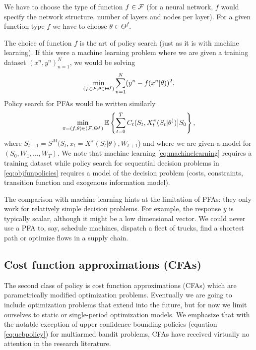 \documentclass[11pt,oneside,fleqn,reqno,titlepage]{article}
\newcommand{\E}{\mathbb{E}}
\newcommand{\bn}{\begin{eqnarray}}
\newcommand{\en}{\end{eqnarray}}
\newcounter{example}
\def \Fcal{{\cal F}}
\begin{document}
We have to choose the type of function $f\in\Fcal$ (for a neural network, $f$ would specify the network structure, number of layers and nodes per layer). For a given function type $f$ we have to choose $\theta\in\Theta^f$.

The choice of function $f$ is the art of policy search (just as it is with machine learning).  If this were a machine learning problem where we are given a training dataset $(x^n,y^n)_{n=1}^N$, we would be solving
\bn
\min_{(f\in\Fcal, \theta\in\Theta^f)}\sum_{n=1}^N(y^n - f(x^n|\theta))^2.\label{eq:machinelearning}
\en
Policy search for PFAs would be written similarly
\bn
\min_{\pi =(f,\theta) \in (\Fcal,\Theta^f)} \E\left\{\sum_{t=0}^T C_t(S_t,X^\pi_t(S_t|\theta^)) \big| S_0\right\}, \label{eq:objfunpolicies}
\en
where $S_{t+1}=S^M(S_t,x_t=X^\pi(S_t|\theta),W_{t+1}$) and where we are given a model for \linebreak $(S_0,W_1, \ldots, W_T)$.  We note that machine learning \eqref{eq:machinelearning} requires a training dataset while policy search for sequential decision problems in \eqref{eq:objfunpolicies} requires a model of the decision problem (costs, constraints, transition function and exogenous information model).

The comparison with machine learning hints at the limitation of PFAs: they only work for relatively simple decision problems.  For example, the response $y$ is typically scalar, although it might be a low dimensional vector.  We could never use a PFA to, say, schedule machines, dispatch a fleet of trucks, find a shortest path or optimize flows in a supply chain.





\subsection{Cost function approximations (CFAs)}
\label{sec:cfas}

The second class of policy is cost function approximations (CFAs) which are parametrically modified optimization problems.  Eventually we are going to include optimization problems that extend into the future, but for now we limit ourselves to static or single-period optimization models. We emphasize that with the notable exception of upper confidence bounding policies (equation \eqref{eq:ucbpolicy}) for multiarmed bandit problems, CFAs have received virtually no attention in the research literature.
\end{document}
